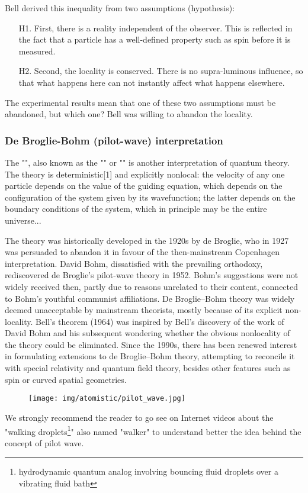 	Bell derived this inequality from two assumptions (hypothesis):
	\begin{enumerate}
		\item[H1.] First, there is a reality independent of the observer. This is reflected in the fact that a particle has a well-defined property such as spin before it is measured. 

		\item[H2.] Second, the locality is conserved. There is no supra-luminous influence, so that what happens here can not instantly affect what happens elsewhere. 
	\end{enumerate}
	The experimental results mean that one of these two assumptions must be abandoned, but which one? Bell was willing to abandon the locality.
	
	\subsubsection{De Broglie-Bohm (pilot-wave) interpretation}
	The "", also known as the "" or "" is another interpretation of quantum theory. The theory is deterministic[1] and explicitly nonlocal: the velocity of any one particle depends on the value of the guiding equation, which depends on the configuration of the system given by its wavefunction; the latter depends on the boundary conditions of the system, which in principle may be the entire universe...

	The theory was historically developed in the 1920s by de Broglie, who in 1927 was persuaded to abandon it in favour of the then-mainstream Copenhagen interpretation. David Bohm, dissatisfied with the prevailing orthodoxy, rediscovered de Broglie's pilot-wave theory in 1952. Bohm's suggestions were not widely received then, partly due to reasons unrelated to their content, connected to Bohm's youthful communist affiliations. De Broglie–Bohm theory was widely deemed unacceptable by mainstream theorists, mostly because of its explicit non-locality. Bell's theorem (1964) was inspired by Bell's discovery of the work of David Bohm and his subsequent wondering whether the obvious nonlocality of the theory could be eliminated. Since the 1990s, there has been renewed interest in formulating extensions to de Broglie–Bohm theory, attempting to reconcile it with special relativity and quantum field theory, besides other features such as spin or curved spatial geometries.
	\begin{figure}[H]
		\centering
		\texttt{[image: img/atomistic/pilot\_wave.jpg]}
	\end{figure}
	We strongly recommend the reader to go see on Internet videos about the "walking droplets\footnote{hydrodynamic quantum analog involving bouncing fluid droplets over a vibrating fluid bath}" also named "walker" to understand better the idea behind the concept of pilot wave. 
	
